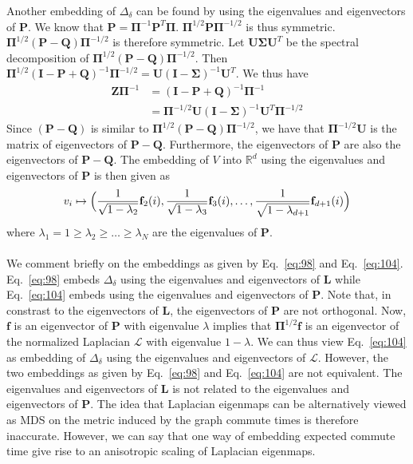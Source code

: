 %
%
\noindent Another embedding of $\Delta_\delta$ can be found by using
the eigenvalues and eigenvectors of $\mathbf{P}$. We know that
$\mathbf{P} = \bm{\Pi}^{-1}\mathbf{P}^{T}\bm{\Pi}$.
$\bm{\Pi}^{1/2}\mathbf{P}\bm{\Pi}^{-1/2}$ is thus symmetric. 
$\bm{\Pi}^{1/2}(\mathbf{P} - \mathbf{Q})\bm{\Pi}^{-1/2}$ is therefore
symmetric. Let $\mathbf{U}\bm{\Sigma}\mathbf{U}^{T}$ be the spectral
decomposition of $\bm{\Pi}^{1/2}(\mathbf{P} -
\mathbf{Q})\bm{\Pi}^{-1/2}$. Then $\bm{\Pi}^{1/2}(\mathbf{I} -
\mathbf{P} + \mathbf{Q})^{-1}\bm{\Pi}^{-1/2} = \mathbf{U}(\mathbf{I} -
\bm{\Sigma})^{-1}\mathbf{U}^{T}$. We thus have
\begin{equation}
  \label{eq:105}
  \begin{split}
  \mathbf{Z}\bm{\Pi}^{-1} &=  (\mathbf{I} - \mathbf{P} +
  \mathbf{Q})^{-1}\bm{\Pi}^{-1} \\ 
  &= \bm{\Pi}^{-1/2} \mathbf{U}(\mathbf{I} -
  \bm{\Sigma})^{-1}\mathbf{U}^{T}\bm{\Pi}^{-1/2} 
  \end{split}
\end{equation}
Since $(\mathbf{P} - \mathbf{Q})$ is similar to
$\bm{\Pi}^{1/2}(\mathbf{P} - \mathbf{Q})\bm{\Pi}^{-1/2}$, we have
that $\bm{\Pi}^{-1/2}\mathbf{U}$ is the matrix of eigenvectors of
$\mathbf{P} - \mathbf{Q}$. Furthermore, the eigenvectors of
$\mathbf{P}$ are also the eigenvectors of $\mathbf{P} - \mathbf{Q}$. 
The embedding of $V$ into $\mathbb{R}^{d}$ using the eigenvalues and
eigenvectors of $\mathbf{P}$ is then given as
\begin{equation}
  \label{eq:104}
  v_i \mapsto \Bigl( \frac{1}{\sqrt{1 - \lambda_2}} \mathbf{f}_2(i),
    \frac{1}{\sqrt{1 - \lambda_3}}\mathbf{f}_3(i), \dots, \frac{1}{\sqrt{1 -
          \lambda_{d+1}}} \mathbf{f}_{d+1}(i) \Bigr)
\end{equation}
where $\lambda_1 = 1 \geq \lambda_2 \geq \dots \geq \lambda_N$ are the
eigenvalues of $\mathbf{P}$. \\ \\
%
%
\noindent
We comment briefly on the embeddings as given by Eq.~\eqref{eq:98} and
Eq.~\eqref{eq:104}. Eq.~\eqref{eq:98} embeds $\Delta_{\delta}$ using
the eigenvalues and eigenvectors of $\mathbf{L}$ while
Eq.~\eqref{eq:104} embeds using the eigenvalues and eigenvectors of
$\mathbf{P}$. Note that, in constrast to the eigenvectors of
$\mathbf{L}$, the eigenvectors of $\mathbf{P}$ are not
orthogonal. Now, $\mathbf{f}$ is an eigenvector of $\mathbf{P}$ with
eigenvalue $\lambda$ implies that $\bm{\Pi}^{1/2}\mathbf{f}$ is an
eigenvector of the normalized Laplacian $\bm{\mathcal{L}}$ with
eigenvalue $1 - \lambda$. We can thus view Eq.~\eqref{eq:104} as
embedding of $\Delta_\delta$ using the eigenvalues and eigenvectors of
$\bm{\mathcal{L}}$. However, the two embeddings as given by
Eq.~\eqref{eq:98} and Eq.~\eqref{eq:104} are not equivalent. The
eigenvalues and eigenvectors of $\mathbf{L}$ is not related to the
eigenvalues and eigenvectors of $\mathbf{P}$. The idea that Laplacian
eigenmaps can be alternatively viewed as MDS on the metric induced by
the graph commute times \citep{saul06:_semis} is therefore
inaccurate. However, we can say that one way of embedding expected
commute time give rise to an anisotropic scaling of Laplacian
eigenmaps.
